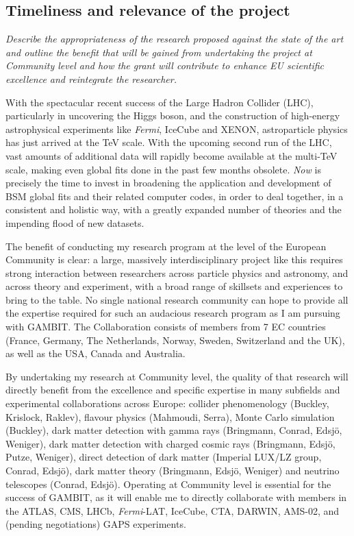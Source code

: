 \documentclass[a4paper,11pt]{article}
\newenvironment{xcomment}{\em}{}
\begin{document}
\subsection{Timeliness and relevance of the project}

\begin{xcomment}
Describe the appropriateness of the research proposed against the
state of the art and outline the benefit that will be gained from
undertaking the project at Community level and how the grant will
contribute to enhance EU scientific excellence and reintegrate the
researcher.
\end{xcomment}

With the spectacular recent success of the Large Hadron Collider (LHC), particularly in uncovering the Higgs boson, and the construction of high-energy astrophysical experiments like \textit{Fermi}, IceCube and XENON, astroparticle physics has just arrived at the TeV scale.  With the upcoming second run of the LHC, vast amounts of additional data will rapidly become available at the multi-TeV scale, making even global fits done in the past few months obsolete.  \textit{Now} is precisely the time to invest in broadening the application and development of BSM global fits and their related computer codes, in order to deal together, in a consistent and holistic way, with a greatly expanded number of theories and the impending flood of new datasets.

The benefit of conducting my research program at the level of the European Community is clear: a large, massively interdisciplinary project like this requires strong interaction between researchers across particle physics and astronomy, and across theory and experiment, with a broad range of skillsets and experiences to bring to the table.  No single national research community can hope to provide all the expertise required for such an audacious research program as I am pursuing with GAMBIT.  The Collaboration consists of members from 7 EC countries (France, Germany, The Netherlands, Norway, Sweden, Switzerland and the UK), as well as the USA, Canada and Australia.

By undertaking my research at Community level, the quality of that research will directly benefit from the excellence and specific expertise in many subfields and experimental collaborations across Europe: collider phenomenology (Buckley, Krislock, Raklev), flavour physics (Mahmoudi, Serra), Monte Carlo simulation (Buckley), dark matter detection with gamma rays (Bringmann, Conrad, Edsj\"o, Weniger), dark matter detection with charged cosmic rays (Bringmann, Edsj\"o, Putze, Weniger), direct detection of dark matter (Imperial LUX/LZ group, Conrad, Edsj\"o), dark matter theory (Bringmann, Edsj\"o, Weniger) and neutrino telescopes (Conrad, Edsj\"o).  Operating at Community level is essential for the success of GAMBIT, as it will enable me to directly collaborate with members in the ATLAS, CMS, LHCb, \textit{Fermi}-LAT, IceCube, CTA, DARWIN, AMS-02, and (pending negotiations) GAPS experiments.  
\end{document}
